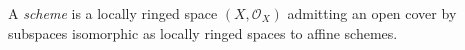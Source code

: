 
A \emph{scheme} is a locally ringed space $(X,\mathcal O_X)$ admitting an open cover by subspaces isomorphic as locally ringed spaces to affine schemes.
